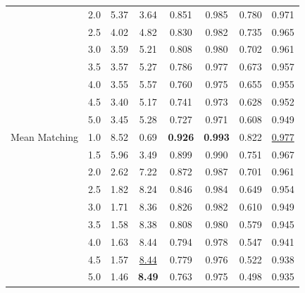 \begin{table}[htbp]
\begin{tabular}{l|l|cccccc|}
 & 2.0 & 5.37 & 3.64 & 0.851 & 0.985 & 0.780 & 0.971 \\
 & 2.5 & 4.02 & 4.82 & 0.830 & 0.982 & 0.735 & 0.965 \\
 & 3.0 & 3.59 & 5.21 & 0.808 & 0.980 & 0.702 & 0.961 \\
 & 3.5 & 3.57 & 5.27 & 0.786 & 0.977 & 0.673 & 0.957 \\
 & 4.0 & 3.55 & 5.57 & 0.760 & 0.975 & 0.655 & 0.955 \\
 & 4.5 & 3.40 & 5.17 & 0.741 & 0.973 & 0.628 & 0.952 \\
 & 5.0 & 3.45 & 5.28 & 0.727 & 0.971 & 0.608 & 0.949 \\
\hline
Mean Matching & 1.0 & 8.52 & 0.69 & \textbf{0.926} & \textbf{0.993} & 0.822 & \underline{0.977} \\
 & 1.5 & 5.96 & 3.49 & 0.899 & 0.990 & 0.751 & 0.967 \\
 & 2.0 & 2.62 & 7.22 & 0.872 & 0.987 & 0.701 & 0.961 \\
 & 2.5 & 1.82 & 8.24 & 0.846 & 0.984 & 0.649 & 0.954 \\
 & 3.0 & 1.71 & 8.36 & 0.826 & 0.982 & 0.610 & 0.949 \\
 & 3.5 & 1.58 & 8.38 & 0.808 & 0.980 & 0.579 & 0.945 \\
 & 4.0 & 1.63 & 8.44 & 0.794 & 0.978 & 0.547 & 0.941 \\
 & 4.5 & 1.57 & \underline{8.44} & 0.779 & 0.976 & 0.522 & 0.938 \\
 & 5.0 & 1.46 & \textbf{8.49} & 0.763 & 0.975 & 0.498 & 0.935 \\
\hline
\end{tabular}
\end{table}


